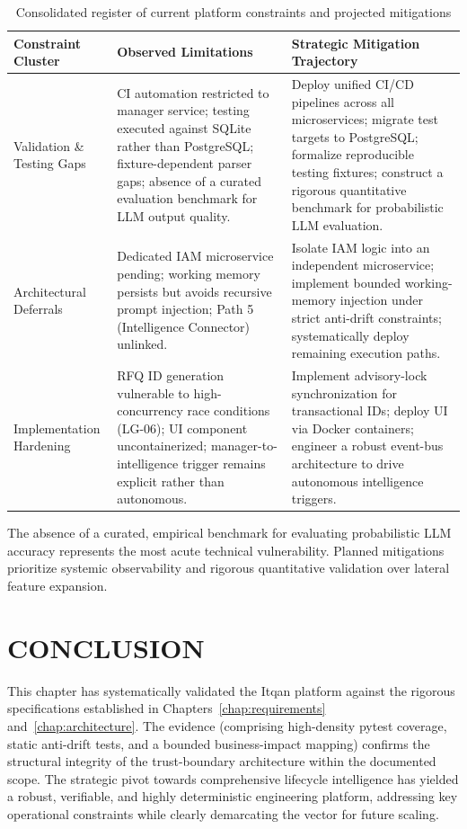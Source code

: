 \begin{table}[H]
\centering
\scriptsize
\renewcommand{\arraystretch}{1.3}
\begin{tabularx}{\textwidth}{|p{2.7cm}|>{\RaggedRight\arraybackslash}X|>{\RaggedRight\arraybackslash}X|}
\hline
\rowcolor{lightgray}
\textbf{Constraint Cluster} & \textbf{Observed Limitations} & \textbf{Strategic Mitigation Trajectory} \\ \hline
Validation \& Testing Gaps & CI automation restricted to manager service; testing executed against SQLite rather than PostgreSQL; fixture-dependent parser gaps; absence of a curated evaluation benchmark for LLM output quality. & Deploy unified CI/CD pipelines across all microservices; migrate test targets to PostgreSQL; formalize reproducible testing fixtures; construct a rigorous quantitative benchmark for probabilistic LLM evaluation. \\ \hline
Architectural Deferrals & Dedicated IAM microservice pending; working memory persists but avoids recursive prompt injection; Path 5 (Intelligence Connector) unlinked. & Isolate IAM logic into an independent microservice; implement bounded working-memory injection under strict anti-drift constraints; systematically deploy remaining execution paths. \\ \hline
Implementation Hardening & RFQ ID generation vulnerable to high-concurrency race conditions (LG-06); UI component uncontainerized; manager-to-intelligence trigger remains explicit rather than autonomous. & Implement advisory-lock synchronization for transactional IDs; deploy UI via Docker containers; engineer a robust event-bus architecture to drive autonomous intelligence triggers. \\ \hline
\end{tabularx}
\caption{Consolidated register of current platform constraints and projected mitigations}
\label{tab:limitations_summary}
\end{table}

The absence of a curated, empirical benchmark for evaluating probabilistic LLM accuracy represents the most acute technical vulnerability. Planned mitigations prioritize systemic observability and rigorous quantitative validation over lateral feature expansion.

\section*{CONCLUSION}
This chapter has systematically validated the Itqan platform against the rigorous specifications established in Chapters~\ref{chap:requirements} and~\ref{chap:architecture}. The evidence (comprising high-density pytest coverage, static anti-drift tests, and a bounded business-impact mapping) confirms the structural integrity of the trust-boundary architecture within the documented scope. The strategic pivot towards comprehensive lifecycle intelligence has yielded a robust, verifiable, and highly deterministic engineering platform, addressing key operational constraints while clearly demarcating the vector for future scaling.
